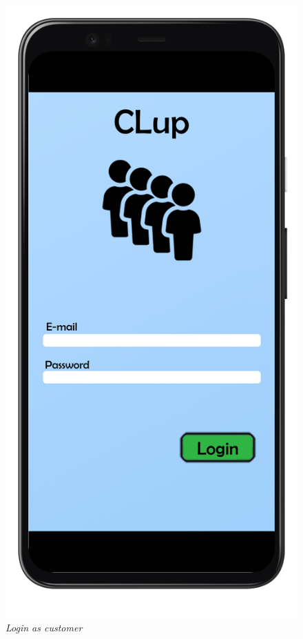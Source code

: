 \documentclass{article}
\begin{document}
\begin{figure}[!h]
\begin{minipage}[!h]{0.4\textwidth}
				\includegraphics[width=\textwidth]{../Mockups/LoginCustomer.png}
				\caption{\emph{Login as customer}}
			\end{minipage}

\end{figure}
\end{document}
